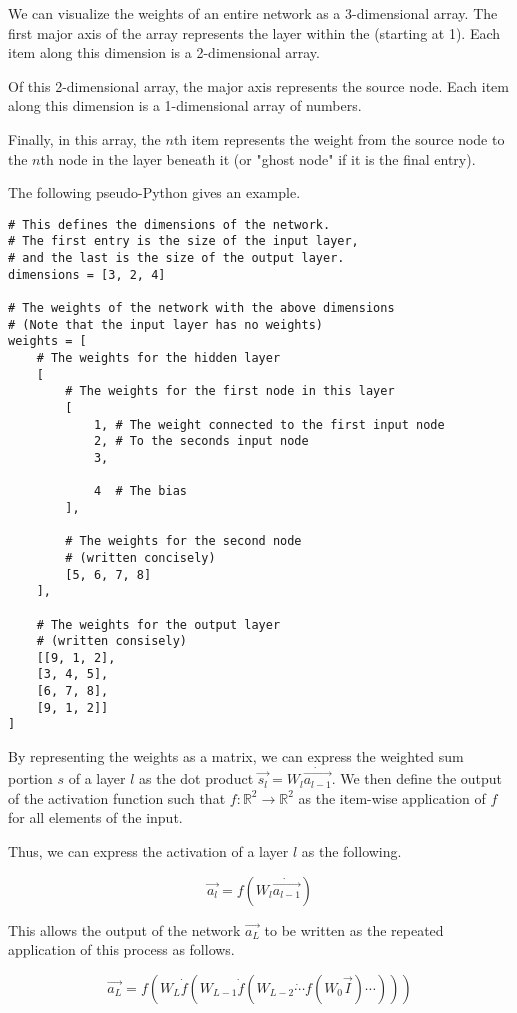 \documentclass[8pt]{amsart}
\begin{document}
We can visualize the weights of an entire network as a 3-dimensional array. The first
major axis of the array represents the layer within the  (starting at 1). Each item
along this dimension is a 2-dimensional array.

Of this 2-dimensional array, the major axis represents the source node. Each item
along this dimension is a 1-dimensional array of numbers.

Finally, in this array, the $n$th item represents the weight from the source node
to the $n$th node in the layer beneath it (or "ghost node" if it is the final entry).

The following pseudo-Python gives an example.

\begin{verbatim}
# This defines the dimensions of the network.
# The first entry is the size of the input layer,
# and the last is the size of the output layer.
dimensions = [3, 2, 4]

# The weights of the network with the above dimensions
# (Note that the input layer has no weights)
weights = [
    # The weights for the hidden layer
    [
        # The weights for the first node in this layer
        [
            1, # The weight connected to the first input node
            2, # To the seconds input node
            3,
            
            4  # The bias
        ],

        # The weights for the second node
        # (written concisely)
        [5, 6, 7, 8]
    ],

    # The weights for the output layer
    # (written consisely)
    [[9, 1, 2],
    [3, 4, 5],
    [6, 7, 8],
    [9, 1, 2]]
]
\end{verbatim}

By representing the weights as a matrix, we can express the weighted sum portion $s$
of a layer $l$ as the dot product $\vec{s_l} = W_l \dot \vec{a_{l - 1}}$. We then
define the output of the activation function such that
$f: \mathbb{R}^2 \to \mathbb{R}^2$ as the item-wise application of $f$ for
all elements of the input.

Thus, we can express the activation of a layer $l$ as the following.

\[
    \vec{a_l} = f(W_l \dot \vec{a_{l - 1}})
\]

This allows the output of the network $\vec{a_L}$ to be written as the repeated
application of this process as follows.

\[
    \vec{a_L} = f \left( 
        W_L \dot f \left(
            W_{L - 1} \dot f \left( 
                W_{L - 2} \dot \cdots
                    f \left( W_0 \vec{I}
                \right) \cdots 
            \right)
        \right)
    \right)
\]
\end{document}
